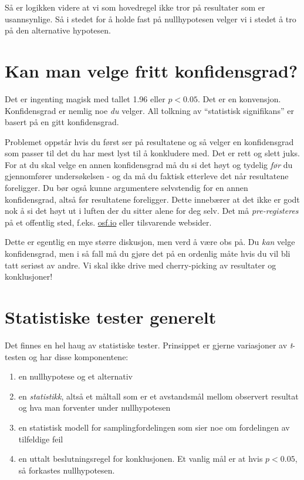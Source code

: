 \documentclass[
  norsk,
  letterpaper,
  DIV=11,
  numbers=noendperiod]{scrreprt}
\providecommand{\tightlist}{%
  \setlength{\itemsep}{0pt}\setlength{\parskip}{0pt}}
\theoremstyle{definition}
\theoremstyle{remark}
\begin{document}
Så er logikken videre at vi som hovedregel ikke tror på resultater som
er usannsynlige. Så i stedet for å holde fast på nullhypotesen velger vi
i stedet å tro på den alternative hypotesen.

\section{Kan man velge fritt
konfidensgrad?}\label{kan-man-velge-fritt-konfidensgrad}

Det er ingenting magisk med tallet 1.96 eller \(p < 0.05\). Det er en
konvensjon. Konfidensgrad er nemlig noe \emph{du} velger. All tolkning
av ``statistisk signifikans'' er basert på en gitt konfidensgrad.

Problemet oppstår hvis du først ser på resultatene og så velger en
konfidensgrad som passer til det du har mest lyst til å konkludere med.
Det er rett og slett juks. For at du skal velge en annen konfidensgrad
må du si det høyt og tydelig \emph{før} du gjennomfører undersøkelsen -
og da må du faktisk etterleve det når resultatene foreligger. Du bør
også kunne argumentere selvstendig for en annen konfidensgrad, altså før
resultatene foreligger. Dette innebærer at det ikke er godt nok å si det
høyt ut i luften der du sitter alene for deg selv. Det må
\emph{pre-registeres} på et offentlig sted, f.eks. \url{osf.io} eller
tilsvarende websider.

Dette er egentlig en mye større diskusjon, men verd å være obs på. Du
\emph{kan} velge konfidensgrad, men i så fall må du gjøre det på en
ordenlig måte hvis du vil bli tatt seriøst av andre. Vi skal ikke drive
med cherry-picking av resultater og konklusjoner!

\section{Statistiske tester generelt}\label{statistiske-tester-generelt}

Det finnes en hel haug av statistiske tester. Prinsippet er gjerne
variasjoner av \emph{t}-testen og har disse komponentene:

\begin{enumerate}
\def\labelenumi{\arabic{enumi}.}
\tightlist
\item
  en nullhypotese og et alternativ
\item
  en \emph{statistikk}, altså et måltall som er et avstandsmål mellom
  observert resultat og hva man forventer under nullhypotesen
\item
  en statistisk modell for samplingfordelingen som sier noe om
  fordelingen av tilfeldige feil
\item
  en uttalt beslutningsregel for konklusjonen. Et vanlig mål er at hvis
  \(p < 0.05\), så forkastes nullhypotesen.
\end{enumerate}
\end{document}
